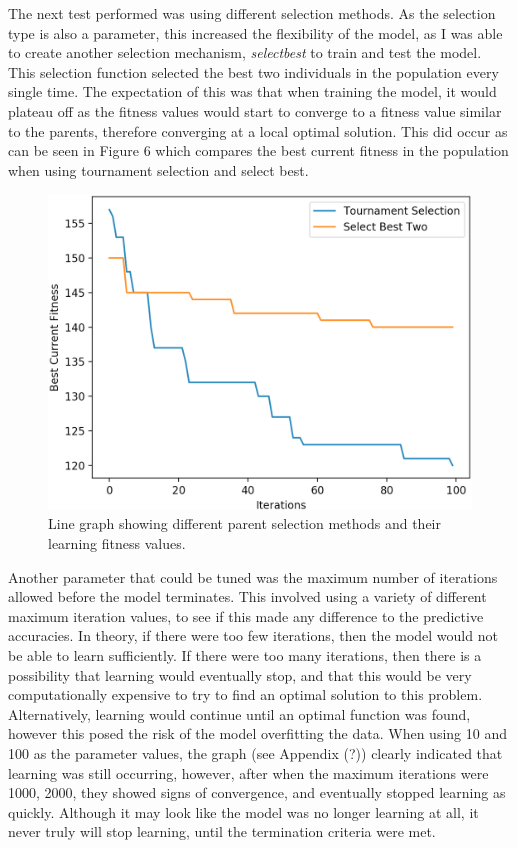 \documentclass[11pt]{article}
\begin{document}
The next test performed was using different selection methods. As the selection type is also a parameter, this increased the flexibility of the model, as I was able to create another selection mechanism, \textit{select\textunderscore best} to train and test the model. This selection function selected the best two individuals in the population every single time. The expectation of this was that when training the model, it would plateau off as the fitness values would start to converge to a fitness value similar to the parents, therefore converging at a local optimal solution. This did occur as can be seen in Figure 6  which compares the best current fitness in the population when using tournament selection and select best. 
\begin{figure}[h]
\centering
\includegraphics[scale = .40]{learning}
\caption{Line graph showing different parent selection methods and their learning fitness values. } 
\end{figure}
Another parameter that could be tuned was the maximum number of iterations allowed before the model terminates. This involved using a variety of different maximum iteration values, to see if this made any difference to the predictive accuracies. In theory, if there were too few iterations, then the model would not be able to learn sufficiently. If there were too many iterations, then there is a possibility that learning would eventually stop, and that this would be very computationally expensive to try to find an optimal solution to this problem. Alternatively, learning would continue until an optimal function was found, however this posed the risk of the model overfitting the data. When using 10 and 100 as the parameter values, the graph (see Appendix (?)) clearly indicated that learning was still occurring, however, after when the maximum iterations were 1000, 2000, they showed signs of convergence, and eventually stopped learning as quickly. Although it may look like the model was no longer learning at all, it never truly will stop learning, until the termination criteria were met.
\end{document}
